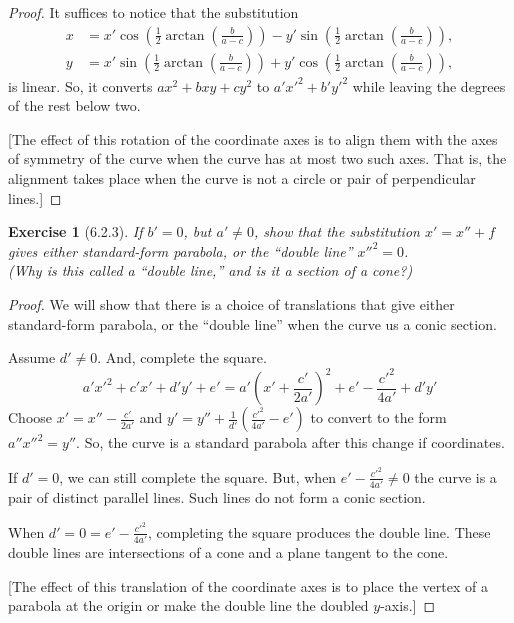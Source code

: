 \documentclass[12pt]{article}
\theoremstyle{plain}
\newtheorem{ex}{Exercise}
\begin{document}
\begin{proof}
  It suffices to notice that the substitution
  \begin{align*}
    x &= x'\cos\left(\frac{1}{2}\arctan\left(\frac{b}{a-c}\right)\right)-y'\sin\left(\frac{1}{2}\arctan\left(\frac{b}{a-c}\right)\right), \\
    y &= x'\sin\left(\frac{1}{2}\arctan\left(\frac{b}{a-c}\right)\right)+y'\cos\left(\frac{1}{2}\arctan\left(\frac{b}{a-c}\right)\right),
  \end{align*}
  is linear. So, it converts $ax^2+bxy+cy^2$ to $a'x'^2+b'y'^2$ while leaving the degrees of the rest below two.

  [The effect of this rotation of the coordinate axes is to align them with the axes of symmetry of the curve when the curve has at most two such axes. That is, the alignment takes place when the curve is not a circle or pair of perpendicular lines.]
\end{proof}

\begin{ex} [6.2.3]
  If $b'=0$, but $a'\neq0$, show that the substitution $x'=x''+f$ gives either standard-form parabola, or the ``double line'' $x''^2=0$. \\
  (Why is this called a ``double line,'' and is it a section of a cone?)
\end{ex}

\begin{proof}
  We will show that there is a choice of translations that give either standard-form parabola, or the ``double line'' when the curve us a conic section.

  Assume $d'\neq0$. And, complete the square.
  \[
    a'x'^2+c'x'+d'y'+e'= a'\left(x'+\frac{c'}{2a'}\right)^2+e'-\frac{c'^2}{4a'}+d'y'
  \]
  Choose $x'=x''-\frac{c'}{2a'}$ and $y'=y''+\frac{1}{d'}\left(\frac{c'^2}{4a'}-e'\right)$ to convert to the form $a''x''^2=y''$. So, the curve is a standard parabola after this change if coordinates.

  If $d'=0$, we can still complete the square. But, when $e'-\frac{c'^2}{4a'}\neq0$ the curve is a pair of distinct parallel lines. Such lines do not form a conic section.

  When $d'=0=e'-\frac{c'^2}{4a'}$, completing the square produces the double line. These double lines are intersections of a cone and a plane tangent to the cone.

  [The effect of this translation of the coordinate axes is to place the vertex of a parabola at the origin or make the double line the doubled $y$-axis.]
\end{proof}
\end{document}
